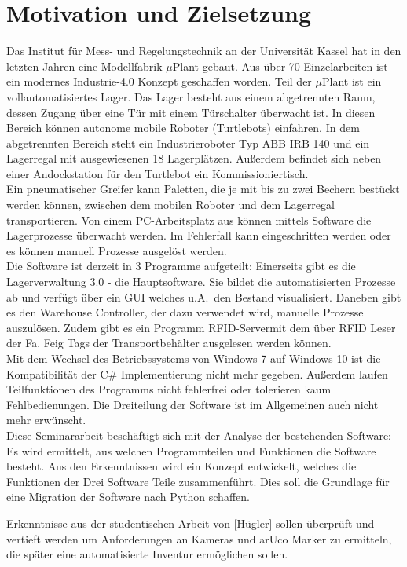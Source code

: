 
\chapter{Motivation und Zielsetzung}

    Das Institut für Mess- und Regelungstechnik an der Universität Kassel hat in den letzten Jahren eine Modellfabrik $\mu$Plant gebaut.
    Aus über 70 Einzelarbeiten ist ein modernes Industrie-4.0 Konzept geschaffen worden.
    Teil der $\mu$Plant ist ein vollautomatisiertes Lager.
    Das Lager besteht aus einem abgetrennten Raum, dessen Zugang über eine Tür mit einem Türschalter überwacht ist.
    In diesen Bereich können autonome mobile Roboter (Turtlebots) einfahren.
    In dem abgetrennten Bereich steht ein Industrieroboter Typ ABB IRB 140 und ein Lagerregal mit ausgewiesenen 18 Lagerplätzen.
    Außerdem befindet sich neben einer Andockstation für den Turtlebot ein Kommissioniertisch. \\

    Ein pneumatischer Greifer kann Paletten, die je mit bis zu zwei Bechern bestückt werden können,
    zwischen dem mobilen Roboter und dem Lagerregal transportieren.
    Von einem PC-Arbeitsplatz aus können mittels Software die Lagerprozesse überwacht werden.
    Im Fehlerfall kann eingeschritten werden oder es können manuell Prozesse ausgelöst werden.\\

    Die Software ist derzeit in 3 Programme aufgeteilt: Einerseits gibt es die Lagerverwaltung 3.0 - die Hauptsoftware.
    Sie bildet die automatisierten Prozesse ab und verfügt über ein GUI welches u.A.\ den Bestand visualisiert.
    Daneben gibt es den Warehouse Controller, der dazu verwendet wird, manuelle Prozesse auszulösen.
    Zudem gibt es ein Programm \glqq RFID-Server\grqq mit dem über RFID Leser der Fa. Feig Tags der Transportbehälter
    ausgelesen werden können.
    \\
    Mit dem Wechsel des Betriebssystems von Windows 7 auf Windows 10 ist die Kompatibilität der C\# Implementierung
    nicht mehr gegeben.
    Außerdem laufen Teilfunktionen des Programms nicht fehlerfrei oder tolerieren kaum Fehlbedienungen.
    Die Dreiteilung der Software ist im Allgemeinen auch nicht mehr erwünscht. \\

    Diese Seminararbeit beschäftigt sich mit der Analyse der bestehenden Software:
    Es wird ermittelt, aus welchen Programmteilen und Funktionen die Software besteht.
    Aus den Erkenntnissen wird ein Konzept entwickelt, welches die Funktionen der Drei Software Teile zusammenführt.
    Dies soll die Grundlage für eine Migration der Software nach Python schaffen.

    Erkenntnisse aus der studentischen Arbeit von [Hügler] sollen überprüft und vertieft werden um Anforderungen
    an Kameras und arUco Marker zu ermitteln, die später eine automatisierte Inventur ermöglichen sollen.

